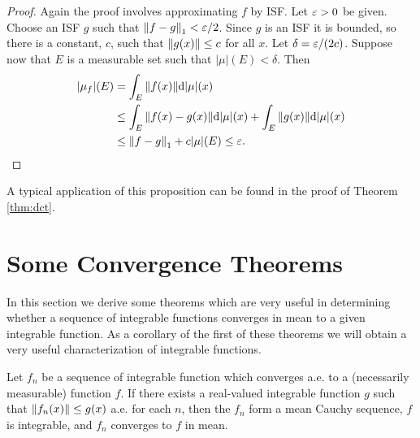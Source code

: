 \begin{proof}
Again the proof involves approximating $f$ by ISF. Let $\varepsilon>0$ be given. Choose an ISF $g$ such that $\norm{f-g}_1<\varepsilon/2$. Since $g$ is an ISF it is bounded, so there is a constant, $c$, such that $\norm{g(x)}\leq c$ for all $x$. Let $\delta=\varepsilon/(2c)$. Suppose now that $E$ is a measurable set such that $|\mu|(E)<\delta$. Then
\begin{align*}
    |\mu_f|(E)&=\int_E\norm{f(x)}\dd|\mu|(x)\\
    &\leq\int_E\norm{f(x)-g(x)}\dd|\mu|(x)+\int_E\norm{g(x)}\dd|\mu|(x)\\
    &\leq\norm{f-g}_1+c|\mu|(E)\leq\varepsilon.
\end{align*}
\end{proof}

A typical application of this proposition can be found in the proof of Theorem \ref{thm:dct}.

\section{Some Convergence Theorems}

In this section we derive some theorems which are very useful in determining whether a sequence of integrable functions converges in mean to a given integrable function. As a corollary of the first of these theorems we will obtain a very useful characterization of integrable functions.

\begin{theorem}\label{thm:dct}
Let $f_n$ be a sequence of integrable function which converges a.e. to a (necessarily measurable) function $f$. If there exists a real-valued integrable function $g$ such that $\norm{f_n(x)}\leq g(x)$ a.e. for each $n$, then the $f_n$ form a mean Cauchy sequence, $f$ is integrable, and $f_n$ converges to $f$ in mean.
\end{theorem}

